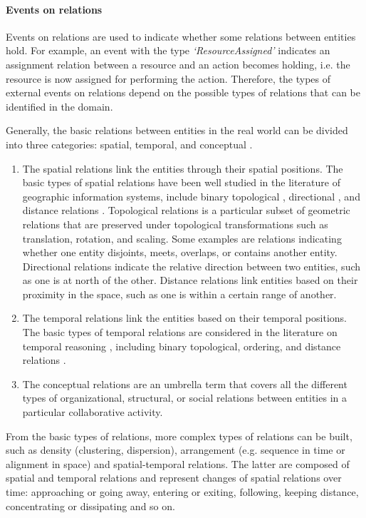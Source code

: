 \paragraph*{Events on relations} %
\label{par:events_on_relations}
Events on relations are used to indicate whether some relations between entities hold. For example, an event with the type \emph{`ResourceAssigned'} indicates an assignment relation between a resource and an action becomes holding, i.e. the resource is now assigned for performing the action. Therefore, the types of external events on relations depend on the possible types of relations that can be identified in the domain. 

Generally, the basic relations between entities in the real world can be divided into three categories: spatial, temporal, and conceptual \cite{Tomaszewski2010}.

\begin{enumerate}
	\item The spatial relations link the entities through their spatial positions. The basic types of spatial relations have been well studied in the literature of geographic information systems, include binary topological \cite{egenhofer1994deriving}, directional \cite{frank1991qualitative}, and distance relations \cite{hernandez1995qualitative}. Topological relations is a particular subset of geometric relations that are preserved under topological transformations such as translation, rotation, and scaling. Some examples are relations indicating whether one entity disjoints, meets, overlaps, or contains another entity. Directional relations indicate the relative direction between two entities, such as one is at north of the other. Distance relations link entities based on their proximity in the space, such as one is within a certain range of another. 
	\item The temporal relations link the entities based on their temporal positions. The basic types of temporal relations are considered in the literature on temporal reasoning \cite{allen1994actions}, including binary topological, ordering, and distance relations \cite{Andrienko2011}.
	\item The conceptual relations are an umbrella term that covers all the different types of organizational, structural, or social relations between entities in a particular collaborative activity. 
\end{enumerate}

From the basic types of relations, more complex types of relations can be built, such as
density (clustering, dispersion), arrangement (e.g. sequence in time or alignment in space) and spatial-temporal relations. The latter are composed of spatial and temporal relations and represent changes of spatial relations over time: approaching or going away, entering or exiting, following, keeping distance, concentrating or dissipating and so on.

